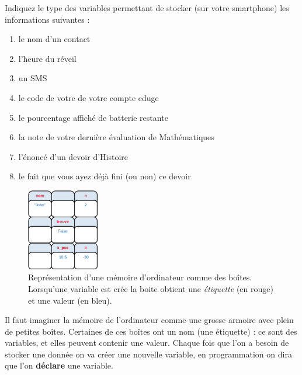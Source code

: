 \documentclass[11pt, a4paper]{book}
\begin{document}
\vspace{1cm}
\act Indiquez le type des variables permettant de stocker (sur votre smartphone) les informations suivantes :
\begin{enumerate}
	\item le nom d’un contact
	\item l’heure du réveil
	\item un SMS
	\item le code de votre de votre compte eduge
	\item le pourcentage affiché de batterie restante
	\item la note de votre dernière évaluation de Mathématiques
	\item l'énoncé d'un devoir d'Histoire
	\item le fait que vous ayez déjà fini (ou non) ce devoir
\end{enumerate}

\vspace{1cm}

\newpage

\begin{figure}
	\centering
	\includegraphics[width=0.28\textwidth]{images/variables/memoire}
	\caption{\small Représentation d'une mémoire d'ordinateur  comme des boîtes. Lorsqu'une variable est crée la boite obtient une \textit{étiquette} (en rouge) et une valeur (en bleu).}
\end{figure}
Il faut imaginer la mémoire de l’ordinateur comme une grosse armoire avec plein de petites boîtes. 
Certaines de ces boîtes ont un nom (une étiquette) : ce sont des variables, et elles peuvent contenir une valeur. Chaque fois que l'on a besoin de stocker une donnée on va créer une nouvelle variable, en programmation on dira que l'on \textbf{déclare} une variable.
\end{document}
